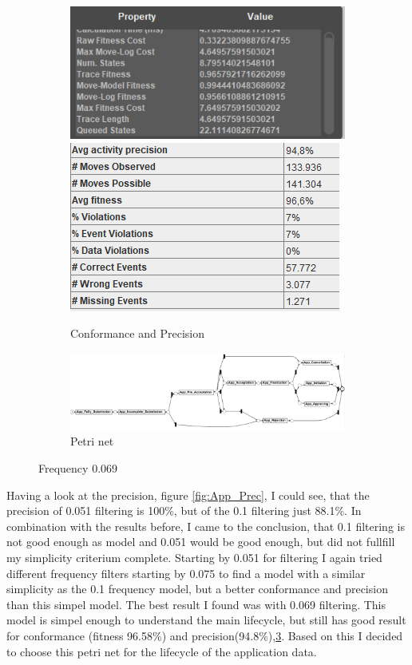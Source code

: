 \begin{figure}[!htbp]
\centering
\begin{subfigure}{.9\textwidth}
  \centering
  \includegraphics[width=0.4\linewidth]{App_Conformance0-069.PNG}
  \includegraphics[width=0.4\linewidth]{App_Precision0-069.PNG}
  \caption{Conformance and Precision}
  \label{fig:APP_Conf0-069}
\end{subfigure}
\begin{subfigure}{\textwidth}
  \centering
  \includegraphics[width=0.9\linewidth]{App_DirectlyFollowedFreq0-069.PNG}
  \caption{Petri net}
  \label{fig:APP_DF0-069}
\end{subfigure}%
\caption{Frequency 0.069}
\label{fig:App_End}
\end{figure}
Having a look at the precision, figure \ref{fig:App_Prec}, I could see, that the precision of 0.051 filtering is 100\%, but of the 0.1 filtering just 88.1\%. In combination with the results before, I came to the conclusion, that 0.1 filtering is not good enough as model and 0.051 would be good enough, but did not fullfill my simplicity criterium complete. Starting by 0.051 for filtering I again tried different frequency filters starting by 0.075 to find a model with a similar simplicity as the 0.1 frequency model, but a better conformance and precision than this simpel model. The best result I found was with 0.069 filtering. This model is simpel enough to understand the main lifecycle, but still has good result for conformance (fitness 96.58\%) and precision(94.8\%),\ref{fig:App_End}.
Based on this I decided to choose this petri net for the lifecycle of the application data.

